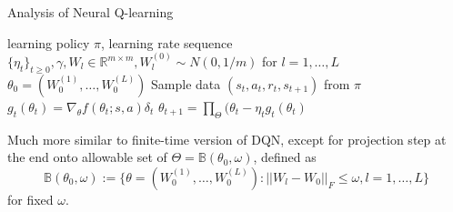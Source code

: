 \documentclass[final]{beamer}
\newlength{\colwidth}
\begin{document}
\begin{frame}[t]
\begin{columns}[t]
\begin{column}{\colwidth}
\begin{block}{Analysis of Neural Q-learning}
\begin{algorithm}[H]%
   \caption{Neural Q-Learning with Gaussian Initialization}
   \label{neur}
\begin{algorithmic}
    learning policy $\pi$, learning rate sequence $\{ \eta_t \}_{t \ge 0}, \gamma, W_l \in \mathbb{R}^{m \times m}, W_l^{(0)} \sim N(0, 1/m)$ for $l = 1, \dots, L$
    $\theta_0 = \left(W_0^{(1)}, \dots, W_0^{(L)}\right)$
   \STATE Sample data $(s_t, a_t, r_t, s_{t+1})$ from $\pi$    
   \STATE $g_t (\theta_t) = \nabla_{\theta} f(\theta_t; s,a) \delta_t$
   \STATE $\theta_{t+1} = \prod_{\Theta} (\theta_t - \eta_t g_t(\theta_t)$
   \ENDFOR
\end{algorithmic}
\end{algorithm} 
Much more similar to finite-time version of DQN, except for projection step at the end onto allowable set of $\Theta = \mathbb{B}(\theta_0, \omega)$, defined as $$\mathbb{B}(\theta_0, \omega) := \{\theta = \left(W_0^{(1)}, \dots, W_0^{(L)}\right) : ||W_l - W_0||_F \le \omega, l = 1, \dots, L \}$$ for fixed $\omega$. \\


\end{block}
\end{column}
\end{columns}
\end{frame}
\end{document}

